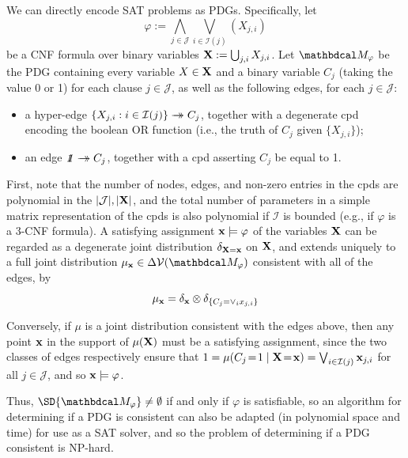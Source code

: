 \documentclass[twoside]{article}
\begin{document}
\begin{lproof} \label{proof:consistent-NP-hard}
	We can directly encode SAT problems as PDGs.
	Specifically, let
	$$\varphi := \bigwedge_{j \in \mathcal J} \bigvee_{i \in \mathcal I(j)} (X_{j,i})$$
	be a CNF formula over binary variables $\mathbf{X} := \bigcup_{j,i} X_{j,i}$. Let
	$\dg M_\varphi$ be the PDG containing every variable $X \in \mathbf{X}$ and a binary
	variable $C_j$ (taking the value 0 or 1) for each clause $j \in \mathcal J$, as well as the following edges, for each $j \in \mathcal J$:
	\begin{itemize}
		\item a hyper-edge $\{X_{j,i} : i \in \mathcal I(j)\} \rightarrow\mathrel{\mspace{-15mu}}\rightarrow C_j$, together with a degenerate cpd
			encoding the boolean OR function (i.e., the truth of $C_j$ given $\{X_{j,i}\}$);
		\item an edge $\pdgunit \tto C_j$, together with a cpd asserting $C_j$ be equal to 1.
	\end{itemize}
	First, note that the number of nodes, edges, and non-zero entries in the cpds are polynomial in the $|\mathcal J|, |\mathbf{X}|$, and the total number of parameters in a simple matrix representation of the cpds is also polynomial if $\mathcal I$ is bounded (e.g., if $\varphi$ is a 3-CNF formula).
	A satisfying assignment $\mathbf{x} \models \varphi$ of the variables $\mathbf{X}$ can be regarded as a degenerate joint distribution $\delta_{\mathbf{X} = \mathbf{x}}$ on $\mathbf{X}$, and extends uniquely to a full joint distribution $\mu_{\mat x} \in \Delta \V(\dg M_\varphi)$ consistent with all of the edges, by
	\[ \mu_{\mathbf{x}} = \delta_{\mathbf{x}} \otimes \delta_{\{C_j = \vee_i  x_{j,i}\}} \]

 	Conversely, if $\mu$ is a joint distribution consistent with the edges above, then any point $\mathbf{x}$ in the support of $\mu(\mathbf{X})$ must be a satisfying assignment, since the two classes of edges respectively ensure that $1 =\mu(C_j\!=\! 1 \mid \mathbf{X} \!=\! \mathbf{x}) = \bigvee_{i \in \mathcal I(j)} \mathbf{x}_{j,i}$ for all $j \in \mathcal J$, and so $\mathbf{x} \models \varphi$.

	Thus, $\SD{\dg M_\varphi} \ne \emptyset$ if and only if $\varphi$ is satisfiable, so
	an algorithm for determining if a PDG is consistent can also be adapted (in polynomial space and time) for use as a SAT solver, and so the problem of determining if a PDG consistent is NP-hard.


\end{lproof}
\end{document}
